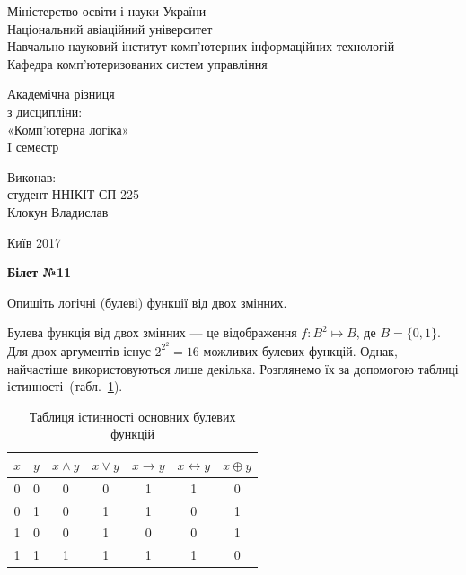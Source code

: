 \documentclass[a4paper,oneside,DIV=12,12pt]{scrartcl}
\newcommand{\sheetno}[1]{{\centering\Large\bfseries Білет №#1\par}}
\renewcommand{\implies}{\rightarrow}
\newcommand{\logicequiv}{\leftrightarrow}
\begin{document}
	\begin{titlepage}
		\begin{center}
			Міністерство освіти і науки України\\
			Національний авіаційний університет\\
			Навчально-науковий інститут комп'ютерних інформаційних технологій\\
			Кафедра комп'ютеризованих систем управління
			
			\vspace{\fill}
				Академічна різниця\\
				з дисципліни:\\
				«Комп'ютерна логіка»\\
				I семестр
				
			\vspace{\fill}
			
			\begin{flushright}
				Виконав:\\
				студент ННІКІТ СП-225\\
				Клокун Владислав\\
			\end{flushright}
			Київ 2017
		\end{center}
	\end{titlepage}
	
	\sheetno{11}
	
	\begin{exercise}
		Опишіть логічні (булеві) функції від двох змінних.
	\end{exercise}
	
	\begin{solution}
		Булева функція від двох змінних --- це відображення $f\colon B^2 \mapsto B$, де $B = \{0, 1\}$. Для двох аргументів існує $2^{2^2} = 16$ можливих булевих функцій. Однак, найчастіше використовуються лише декілька. Розглянемо їх за допомогою таблиці істинності~(табл.~\ref{fig:bool-functioins-truth-table}).
		
		\begin{table}[!htbp]
		\centering
			\begin{tabular}{ccccccc}
				\toprule
					$x$ & $y$ & $x \land y$ & $x \lor y$ & $x \implies y$ & $x \logicequiv y$ & $x \oplus y $\\
				\midrule
					0   & 0   & 0           & 0          & 1              & 1                 & 0\\
					0   & 1   & 0           & 1          & 1              & 0                 & 1\\
					1   & 0   & 0           & 1          & 0              & 0                 & 1\\
					1   & 1   & 1           & 1          & 1              & 1                 & 0\\
				\bottomrule
			\end{tabular}
		\caption{Таблиця істинності основних булевих функцій}
		\label{fig:bool-functioins-truth-table}
		\end{table}
	\end{solution}
	
\end{document}
